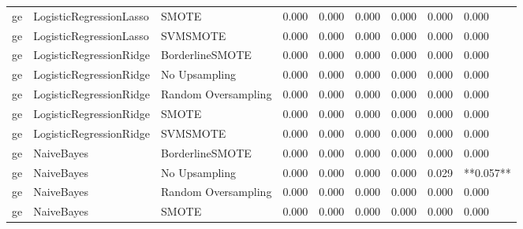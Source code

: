 \begin{tabular}{lllllllll}
      ge &      LogisticRegressionLasso &               SMOTE & 0.000 &                     0.000 &                 0.000 &                  0.000 &                                   0.000 &     0.000 \\
      ge &      LogisticRegressionLasso &            SVMSMOTE & 0.000 &                     0.000 &                 0.000 &                  0.000 &                                   0.000 &     0.000 \\
      ge &      LogisticRegressionRidge &     BorderlineSMOTE & 0.000 &                     0.000 &                 0.000 &                  0.000 &                                   0.000 &     0.000 \\
      ge &      LogisticRegressionRidge &       No Upsampling & 0.000 &                     0.000 &                 0.000 &                  0.000 &                                   0.000 &     0.000 \\
      ge &      LogisticRegressionRidge & Random Oversampling & 0.000 &                     0.000 &                 0.000 &                  0.000 &                                   0.000 &     0.000 \\
      ge &      LogisticRegressionRidge &               SMOTE & 0.000 &                     0.000 &                 0.000 &                  0.000 &                                   0.000 &     0.000 \\
      ge &      LogisticRegressionRidge &            SVMSMOTE & 0.000 &                     0.000 &                 0.000 &                  0.000 &                                   0.000 &     0.000 \\
      ge &                   NaiveBayes &     BorderlineSMOTE & 0.000 &                     0.000 &                 0.000 &                  0.000 &                                   0.000 &     0.000 \\
      ge &                   NaiveBayes &       No Upsampling & 0.000 &                     0.000 &                 0.000 &                  0.000 &                                   0.029 & **0.057** \\
      ge &                   NaiveBayes & Random Oversampling & 0.000 &                     0.000 &                 0.000 &                  0.000 &                                   0.000 &     0.000 \\
      ge &                   NaiveBayes &               SMOTE & 0.000 &                     0.000 &                 0.000 &                  0.000 &                                   0.000 &     0.000 \\

\end{tabular}
